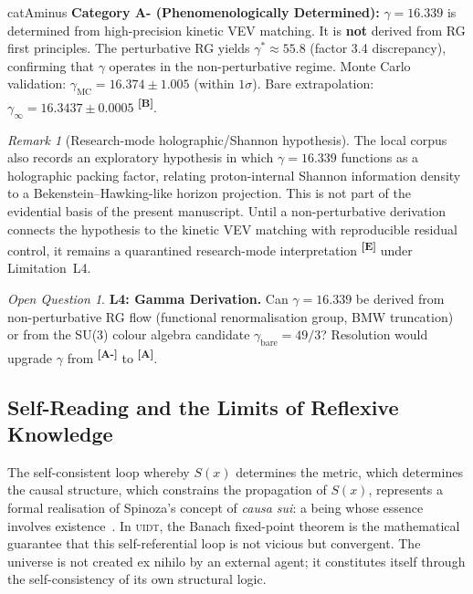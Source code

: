 \documentclass[12pt,a4paper,twoside]{article}
\theoremstyle{plain}
\theoremstyle{definition}
\theoremstyle{remark}
\newtheorem{remark}[theorem]{Remark}
\newtheorem{openquestion}{Open Question}
\newcommand{\UIDT}{\textsc{uidt}}
\newcommand{\catmark}[1]{\textsuperscript{\textsf{\textbf{[#1]}}}}
\newcommand{\GammaGeom}{16.339}                     %
\begin{document}
\begin{evidencebox}{catAminus}
\textbf{Category A- (Phenomenologically Determined):}
$\gamma = \GammaGeom$ is determined from high-precision kinetic VEV matching.
It is \textbf{not} derived from RG first principles. The perturbative RG
yields $\gamma^* \approx 55.8$ (factor 3.4 discrepancy), confirming that
$\gamma$ operates in the non-perturbative regime.
Monte Carlo validation: $\gamma_{\mathrm{MC}} = 16.374 \pm 1.005$ (within $1\sigma$).
Bare extrapolation: $\gamma_\infty = 16.3437 \pm 0.0005$ \catmark{B}.
\end{evidencebox}
\begin{remark}[Research-mode holographic/Shannon hypothesis]
\label{rem:gamma-shannon}
The local corpus also records an exploratory hypothesis in which
$\gamma=\GammaGeom$ functions as a holographic packing factor, relating
proton-internal Shannon information density to a Bekenstein--Hawking-like
horizon projection. This is not part of the evidential basis of the present
manuscript. Until a non-perturbative derivation connects the hypothesis to the
kinetic VEV matching with reproducible residual control, it remains a
quarantined research-mode interpretation \catmark{E} under Limitation~L4.
\end{remark}
\vspace{0.6em}
\begin{openquestion}
\textbf{L4: Gamma Derivation.} Can $\gamma = \GammaGeom$ be derived from
non-perturbative RG flow (functional renormalisation group, BMW truncation)
or from the SU(3) colour algebra candidate $\gamma_{\mathrm{bare}} = 49/3$?
Resolution would upgrade $\gamma$ from \catmark{A-} to \catmark{A}.
\end{openquestion}

\subsection{Self-Reading and the Limits of Reflexive Knowledge}
\label{subsec:self-reading}

The self-consistent loop whereby $S(x)$ determines the metric, which determines
the causal structure, which constrains the propagation of $S(x)$, represents a
formal realisation of Spinoza's concept of \emph{causa sui}: a being whose
essence involves existence~\cite{Spinoza1677}. In \UIDT, the Banach fixed-point
theorem is the mathematical guarantee that this self-referential loop is not
vicious but convergent. The universe is not created ex nihilo by an external
agent; it constitutes itself through the self-consistency of its own structural
logic.
\end{document}
